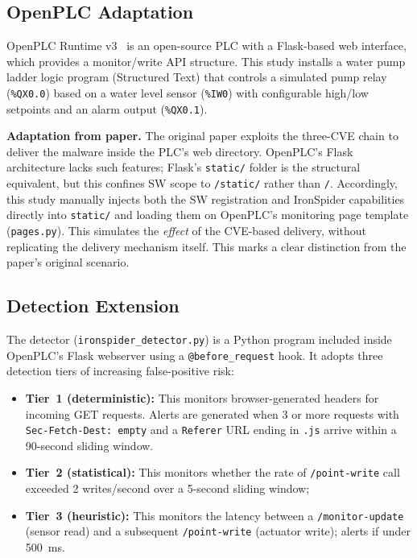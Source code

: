 \documentclass[conference]{IEEEtran}
\begin{document}
\subsection{OpenPLC Adaptation}

OpenPLC Runtime v3~\cite{openplc} is an open-source PLC with a Flask-based web interface, which provides a monitor/write API structure. This study installs a water pump ladder logic program (Structured Text) that controls a simulated pump relay (\texttt{\%QX0.0}) based on a water level sensor (\texttt{\%IW0}) with configurable high/low setpoints and an alarm output (\texttt{\%QX0.1}).

\textbf{Adaptation from paper.} The original paper exploits the three-CVE chain to deliver the malware inside the PLC's web directory. OpenPLC's Flask architecture lacks such features; Flask's \texttt{static/} folder is the structural equivalent, but this confines SW scope to \texttt{/static/} rather than \texttt{/}. Accordingly, this study manually injects both the SW registration and IronSpider capabilities directly into \texttt{static/} and loading them on OpenPLC's monitoring page template (\texttt{pages.py}). This simulates the \emph{effect} of the CVE-based delivery, without replicating the delivery mechanism itself. This marks a clear distinction from the paper's original scenario.

\subsection{Detection Extension}

The detector (\texttt{ironspider\_detector.py}) is a Python program included inside OpenPLC's Flask webserver using a \texttt{@before\_request} hook. It adopts three detection tiers of increasing false-positive risk:

\begin{itemize}
  \item \textbf{Tier~1 (deterministic):} This monitors browser-generated headers for incoming GET requests. Alerts are generated when 3 or more requests with \texttt{Sec-Fetch-Dest: empty} and a \texttt{Referer} URL ending in \texttt{.js} arrive within a 90-second sliding window.
  \item \textbf{Tier~2 (statistical):} This monitors whether the rate of \texttt{/point-write} call exceeded 2 writes/second over a 5-second sliding window;
  \item \textbf{Tier~3 (heuristic):} This monitors the latency between a \texttt{/monitor-update} (sensor read) and a subsequent \texttt{/point-write} (actuator write); alerts if under 500~ms.
\end{itemize}
\end{document}

